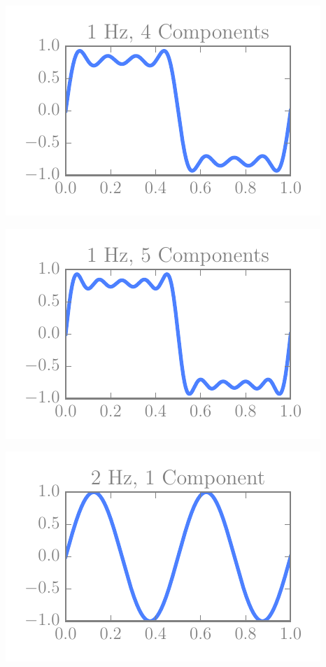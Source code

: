 \begin{multicols}{5}
\includegraphics[width=\linewidth]{../img/fouriers/1_4.pdf}

\includegraphics[width=\linewidth]{../img/fouriers/1_5.pdf}

\includegraphics[width=\linewidth]{../img/fouriers/2_1.pdf}


\end{multicols}
